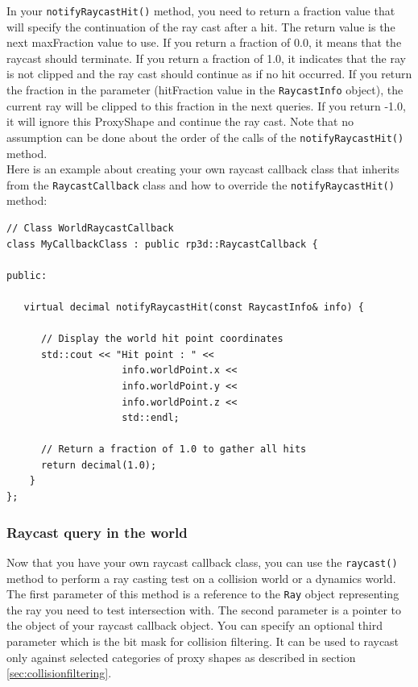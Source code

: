 \documentclass[a4paper,12pt]{article}
\begin{document}
    In your \texttt{notifyRaycastHit()} method, you need to return a fraction value that will specify the continuation of the ray cast after a hit.
    The return value is the next maxFraction value to use. If you return a fraction of 0.0, it means that the raycast should terminate. If you return a
    fraction of 1.0, it indicates that the ray is not clipped and the ray cast should continue as if no hit occurred. If you return the fraction in the
    parameter (hitFraction value in the \texttt{RaycastInfo} object), the current ray will be clipped to this fraction in the next queries. If you return -1.0, it will
    ignore this ProxyShape and continue the ray cast. Note that no assumption can be done about the order of the calls of the \texttt{notifyRaycastHit()} method. \\

    Here is an example about creating your own raycast callback class that inherits from the \texttt{RaycastCallback} class and how to override the
    \texttt{notifyRaycastHit()} method: \\

    \begin{lstlisting}
// Class WorldRaycastCallback
class MyCallbackClass : public rp3d::RaycastCallback {

public:

   virtual decimal notifyRaycastHit(const RaycastInfo& info) {

      // Display the world hit point coordinates
      std::cout << "Hit point : " <<
                    info.worldPoint.x <<
                    info.worldPoint.y <<
                    info.worldPoint.z <<
                    std::endl;

      // Return a fraction of 1.0 to gather all hits
      return decimal(1.0);
    }
};
  \end{lstlisting}

    \subsubsection{Raycast query in the world}

    Now that you have your own raycast callback class, you can use the \texttt{raycast()} method to perform a ray casting test
    on a collision world or a dynamics world. \\

    The first parameter of this method is a reference to the \texttt{Ray} object representing the ray you need to test intersection with. The second parameter is a pointer to
    the object of your raycast callback object. You can specify an optional third parameter which is the bit mask for collision filtering.
    It can be used to raycast only against selected categories of proxy shapes as described in section \ref{sec:collisionfiltering}. \\
\end{document}
